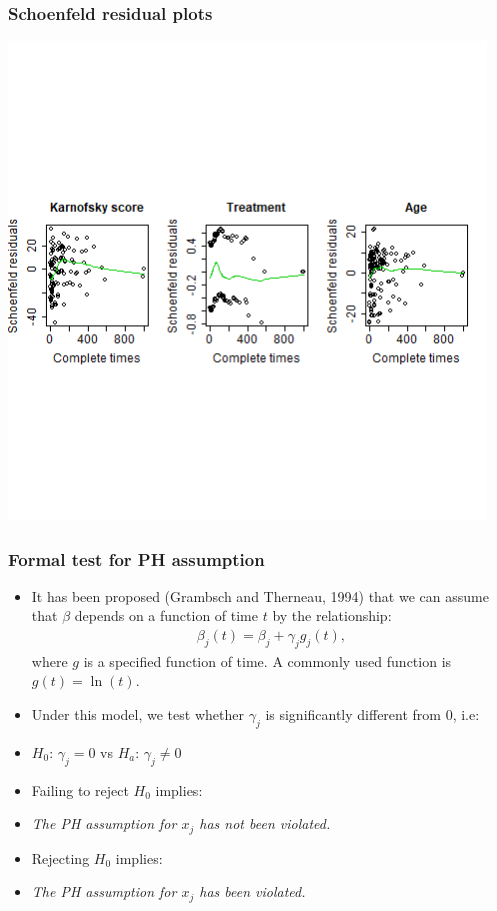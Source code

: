 \begin{frame}[fragile]
\frametitle{Schoenfeld residual plots}
\includegraphics[width=0.95\textwidth, clip, trim={0 5cm 0cm 5cm}]{Figures/schoen_residuals.png}
\vskip100pt
\end{frame}




\begin{frame}
\frametitle{Formal test for PH assumption}
\begin{itemize}
\item It has been proposed (Grambsch and Therneau, 1994) that we can assume that $\beta$ depends on a
function of time $t$ by the relationship:
\begin{eqnarray}
\beta_j(t)=\beta_j+\gamma_jg_j(t),\nonumber
\end{eqnarray}
where $g$ is a specified function of time.  A commonly used function is $g(t)=\ln(t)$.
\item Under this model, we test whether $\gamma_j$ is significantly different from 0, i.e:
\item[] $H_0$: $\gamma_j = 0$ vs $H_a$: $\gamma_j \neq 0$
\item Failing to reject $H_0$ implies:
\item[] \emph{The PH assumption for $x_j$ has not been violated.}
\item Rejecting $H_0$ implies:
\item[] \emph{The PH assumption for $x_j$ has been violated.}
\end{itemize}
\end{frame}

